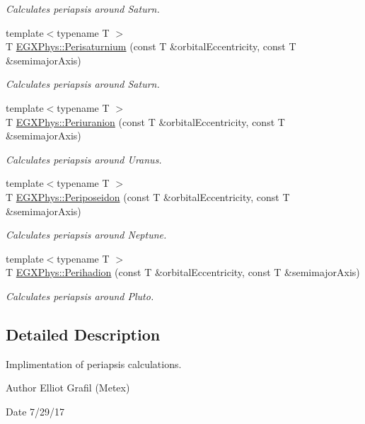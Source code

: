 \begin{DoxyCompactItemize}
\begin{DoxyCompactList}\small\item\em Calculates periapsis around Saturn. \end{DoxyCompactList}\item 
{\footnotesize template$<$typename T $>$ }\\T \mbox{\hyperlink{group___e_g_x_phys-_periapsis_ga60a50d09d29ebe47cbbfc125c2ea42bf}{E\+G\+X\+Phys\+::\+Perisaturnium}} (const T \&orbital\+Eccentricity, const T \&semimajor\+Axis)
\begin{DoxyCompactList}\small\item\em Calculates periapsis around Saturn. \end{DoxyCompactList}\item 
{\footnotesize template$<$typename T $>$ }\\T \mbox{\hyperlink{group___e_g_x_phys-_periapsis_gab8b8131a617dd2d2a4de1d48accd7442}{E\+G\+X\+Phys\+::\+Periuranion}} (const T \&orbital\+Eccentricity, const T \&semimajor\+Axis)
\begin{DoxyCompactList}\small\item\em Calculates periapsis around Uranus. \end{DoxyCompactList}\item 
{\footnotesize template$<$typename T $>$ }\\T \mbox{\hyperlink{group___e_g_x_phys-_periapsis_ga237e7af3794202c67e65f64f4c8abc2a}{E\+G\+X\+Phys\+::\+Periposeidon}} (const T \&orbital\+Eccentricity, const T \&semimajor\+Axis)
\begin{DoxyCompactList}\small\item\em Calculates periapsis around Neptune. \end{DoxyCompactList}\item 
{\footnotesize template$<$typename T $>$ }\\T \mbox{\hyperlink{group___e_g_x_phys-_periapsis_gafb16e46e55078b38604eef0d7c7c40c4}{E\+G\+X\+Phys\+::\+Perihadion}} (const T \&orbital\+Eccentricity, const T \&semimajor\+Axis)
\begin{DoxyCompactList}\small\item\em Calculates periapsis around Pluto. \end{DoxyCompactList}\end{DoxyCompactItemize}


\subsection{Detailed Description}
Implimentation of periapsis calculations. 

\begin{DoxyAuthor}{Author}
Elliot Grafil (Metex) 
\end{DoxyAuthor}
\begin{DoxyDate}{Date}
7/29/17 
\end{DoxyDate}
